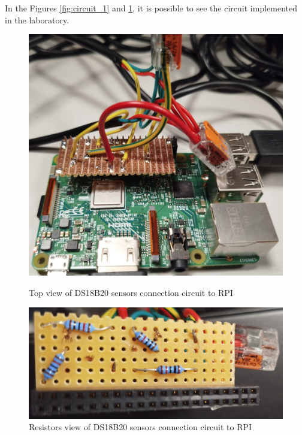 In the Figures \ref{fig:circuit_1} and \ref{fig:circuit_2}, it is possible to see the circuit implemented in the laboratory.

\begin{figure}[H]
    \centering
    \begin{minipage}{0.48\textwidth}
        \centering
        \includegraphics[width=\linewidth]{figures/circuit_1.png}
        \caption{Top view of DS18B20 sensors connection circuit to RPI}
        \label{fig:circuit_1}
    \end{minipage}\hfill
    \begin{minipage}{0.48\textwidth}
        \centering
        \includegraphics[width=\linewidth]{figures/circuit_2.png}
        \caption{Resistors view of DS18B20 sensors connection circuit to RPI}
        \label{fig:circuit_2}
    \end{minipage}
\end{figure}

